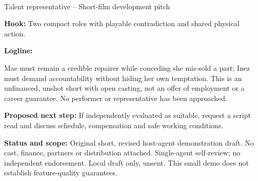 \documentclass[11pt,letterpaper]{article}
\begin{document}
\begin{center}
{\Large\bfseries\sffamily \filmtitleupper}\\[6pt]
Talent representative -- Short-film development pitch
\end{center}
\textbf{Hook:} Two compact roles with playable contradiction and shared physical action.

\textbf{Logline:} \filmlogline

Mae must remain a credible repairer while conceding she mis-sold a part; Inez must demand accountability without hiding her own temptation. This is an unfinanced, unshot short with open casting, not an offer of employment or a career guarantee. No performer or representative has been approached.

\textbf{Proposed next step:} If independently evaluated as suitable, request a script read and discuss schedule, compensation and safe working conditions.

\textbf{Status and scope:} Original short, revised host-agent demonstration draft. No cast, finance, partners or distribution attached. Single-agent self-review; no independent endorsement. Local draft only, unsent. This small demo does not establish feature-quality guarantees.
\end{document}
